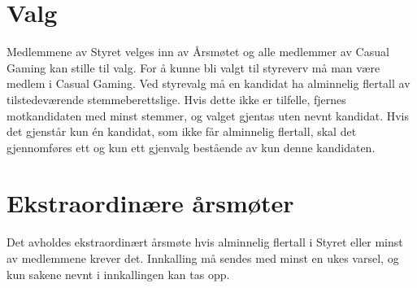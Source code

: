 \section{Valg}
Medlemmene av Styret velges inn av Årsmøtet og alle medlemmer av Casual Gaming kan stille til valg. For å kunne bli valgt til styreverv må man være medlem i Casual Gaming. Ved styrevalg må en kandidat ha alminnelig flertall av tilstedeværende stemmeberettslige. Hvis dette ikke er tilfelle, fjernes motkandidaten med minst stemmer, og valget gjentas uten nevnt kandidat. Hvis det gjenstår kun én kandidat, som ikke får alminnelig flertall, skal det gjennomføres ett og kun ett gjenvalg bestående av kun denne kandidaten.

\section{Ekstraordinære årsmøter}
Det avholdes ekstraordinært årsmøte hvis alminnelig flertall i Styret eller minst  av medlemmene krever det. Innkalling må sendes med minst en ukes varsel, og kun sakene nevnt i innkallingen kan tas opp.
